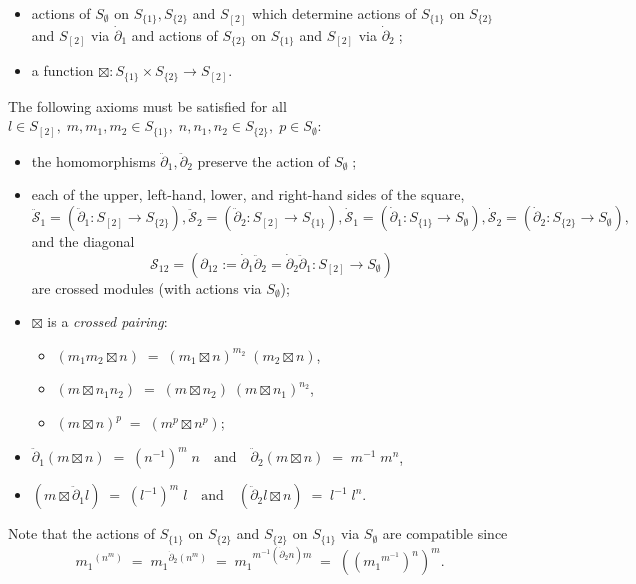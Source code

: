 \documentclass[a4paper,11pt]{report}
\begin{document}
{\begin{itemize}
\item  actions of $S_{\emptyset}$ on $S_{\{1\}}, S_{\{2\}}$ and $S_{[2]}$ which determine actions of $S_{\{1\}}$ on $S_{\{2\}}$ and $S_{[2]}$ via $\dot{\partial}_1$ and actions of $S_{\{2\}}$ on $S_{\{1\}}$ and $S_{[2]}$ via $\dot{\partial}_2\;$; 
\item  a function $\boxtimes : S_{\{1\}} \times S_{\{2\}} \to S_{[2]}$. 
\end{itemize}
 The following axioms must be satisfied for all $l \in S_{[2]},\; m,m_1,m_2 \in S_{\{1\}},\; n,n_1,n_2 \in S_{\{2\}},\; p \in
S_{\emptyset}$: 
\begin{itemize}
\item  the homomorphisms $\ddot{\partial}_1, \ddot{\partial}_2$ preserve the action of $S_{\emptyset}\;$; 
\item  each of the upper, left-hand, lower, and right-hand sides of the square, 
\[ \ddot{\mathcal{S}}_1 = (\ddot{\partial}_1 : S_{[2]} \to S_{\{2\}}),
\ddot{\mathcal{S}}_2 = (\ddot{\partial}_2 : S_{[2]} \to S_{\{1\}}),
\dot{\mathcal{S}}_1 = (\dot{\partial}_1 : S_{\{1\}} \to S_{\emptyset}),
\dot{\mathcal{S}}_2 = (\dot{\partial}_2 : S_{\{2\}} \to S_{\emptyset}), \]
 and the diagonal 
\[ \mathcal{S}_{12} = (\partial_{12} := \dot{\partial}_1\ddot{\partial}_2 =
\dot{\partial}_2\ddot{\partial}_1 : S_{[2]} \to S_{\emptyset}) \]
 are crossed modules (with actions via $S_{\emptyset}$); 
\item  {} $\boxtimes$ is a \emph{crossed pairing}: 
\begin{itemize}
\item  $(m_1m_2 \boxtimes n)\;=\; {(m_1 \boxtimes n)}^{m_2}\;(m_2 \boxtimes n)$, 
\item  $(m \boxtimes n_1n_2) \;=\; (m \boxtimes n_2)\;{(m \boxtimes n_1)}^{n_2}$, 
\item  $(m \boxtimes n)^{p} \;=\; (m^p \boxtimes n^p)$; 
\end{itemize}
 
\item  $\ddot{\partial}_1 (m \boxtimes n) \;=\; (n^{-1})^{m}\;n \quad \mbox{and} \quad
\ddot{\partial}_2 (m \boxtimes n) \;=\; m^{-1}\;m^{n}$, 
\item  $(m \boxtimes \ddot{\partial}_1 l) \;=\; (l^{-1})^{m}\;l \quad \mbox{and} \quad
(\ddot{\partial}_2 l \boxtimes n) \;=\; l^{-1}\;l^n$. 
\end{itemize}
 Note that the actions of $S_{\{1\}}$ on $S_{\{2\}}$ and $S_{\{2\}}$ on $S_{\{1\}}$ via $S_{\emptyset}$ are compatible since 
\[ {m_1}^{(n^m)} \;=\; {m_1}^{\dot{\partial}_2(n^m)} \;=\;
{m_1}^{m^{-1}(\dot{\partial}_2 n)m} \;=\; (({m_1}^{m^{-1}})^n)^m. \]
 

}
\end{document}
